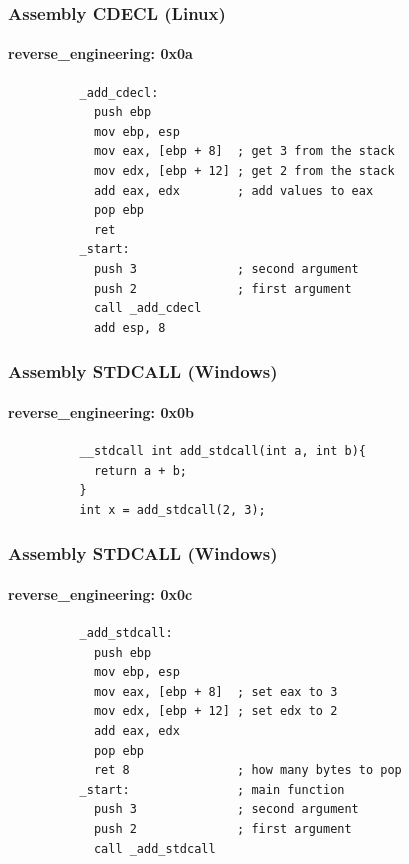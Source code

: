 \documentclass[aspectratio=169]{beamer}
\begin{document}
\begin{frame}[fragile]{}
  \frametitle{Assembly CDECL (Linux)}
  \framesubtitle{reverse\_engineering: 0x0a}
  \begin{center}
    \begin{tcolorbox}[title=cdecl.asm,colback=black]
        \begin{verbatim}
          _add_cdecl:
            push ebp
            mov ebp, esp
            mov eax, [ebp + 8]  ; get 3 from the stack
            mov edx, [ebp + 12] ; get 2 from the stack
            add eax, edx        ; add values to eax
            pop ebp
            ret
          _start:
            push 3              ; second argument 
            push 2              ; first argument
            call _add_cdecl
            add esp, 8
        \end{verbatim}
    \end{tcolorbox}
  \end{center}
\end{frame}

\begin{frame}[fragile]{}
  \frametitle{Assembly STDCALL (Windows)}
  \framesubtitle{reverse\_engineering: 0x0b}
  \begin{center}
    \begin{tcolorbox}[title=stdcall.c,colback=black]
        \begin{verbatim}
          __stdcall int add_stdcall(int a, int b){
            return a + b;
          }
          int x = add_stdcall(2, 3);
        \end{verbatim}
    \end{tcolorbox}
  \end{center}
\end{frame}

\begin{frame}[fragile]{}
  \frametitle{Assembly STDCALL (Windows)}
  \framesubtitle{reverse\_engineering: 0x0c}
  \begin{center}
    \begin{tcolorbox}[title=stdcall.asm,colback=black]
        \begin{verbatim}
          _add_stdcall:
            push ebp
            mov ebp, esp
            mov eax, [ebp + 8]  ; set eax to 3
            mov edx, [ebp + 12] ; set edx to 2
            add eax, edx
            pop ebp
            ret 8               ; how many bytes to pop
          _start:               ; main function
            push 3              ; second argument
            push 2              ; first argument
            call _add_stdcall
        \end{verbatim}
    \end{tcolorbox}
  \end{center}
\end{frame}
\end{document}
